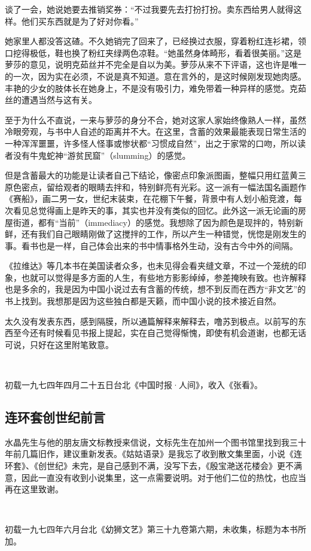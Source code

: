 \par 谈了一会，她说她要去推销奖券：“不过我要先去打扮打扮。卖东西给男人就得这样。他们买东西就是为了好对你看。”
\par 她家里人都没答这碴。不久她销完了回来了，已经换过衣服，穿着粉红连衫裙，领口挖得极低，鞋也换了粉红夹绿两色凉鞋。“她虽然身体畸形，看着很美丽。”这是萝莎的意见，说明克茹丝并不完全是自以为美。萝莎从来不下评语，这也许是唯一的一次，因为实在必须，不说是真不知道。意在言外的，是这时候刚发现她肉感。丰艳的少女的肢体长在她身上，不是没有吸引力，难免带着一种异样的感觉。克茹丝的遭遇当然与这有关。
\par 至于为什么不直说，一来与萝莎的身分不合，她对这家人家始终像熟人一样，虽然冷眼旁观，与书中人自述的距离并不大。在这里，含蓄的效果最能表现日常生活的一种浑浑噩噩，许多怪人怪事或惨状都“习惯成自然”，出之于家常的口吻，所以读者没有牛鬼蛇神“游贫民窟”（slumming）的感觉。
\par 但是含蓄最大的功能是让读者自己下结论，像密点印象派图画，整幅只用红蓝黄三原色密点，留给观者的眼睛去拌和，特别鲜亮有光彩。这一派有一幅法国名画题作《赛船》，画二男一女，世纪末装束，在花棚下午餐，背景中有人划小船竞渡，每次看见总觉得画上是昨天的事，其实也并没有类似的回忆。此外这一派无论画的房屋街道，都有“当前”（immediacy）的感觉。我想除了因为颜色是现拌的，特别新鲜，还有我们自己眼睛刚做了这搅拌的工作，所以产生一种错觉，恍惚是刚发生的事。看书也是一样，自己体会出来的书中情事格外生动，没有古今中外的间隔。
\par 《拉维达》等几本书在美国读者众多，也未见得会看夹缝文章，不过一个笼统的印象，也就可以觉得是多方面的人生，有些地方影影绰绰，参差掩映有致。也许解释也是多余的，我是因为中国小说过去有含蓄的传统，想不到反而在西方“非文艺”的书上找到。我想那是因为这些独白都是天籁，而中国小说的技术接近自然。
\par 太久没有发表东西，感到隔膜，所以通篇解释来解释去，噜苏到极点。以前写的东西至今还有时候看见书报上提起，实在自己觉得惭愧，即使有机会道谢，也都无话可说，只好在这里附笔致意。
\par  
\par *初载一九七四年四月二十五日台北《中国时报·人间》，收入《张看》。


\subsection{连环套创世纪前言}

\par 水晶先生与他的朋友唐文标教授来信说，文标先生在加州一个图书馆里找到我三十年前几篇旧作，建议重新发表。《姑姑语录》是我忘了收到散文集里面，小说《连环套》、《创世纪》未完，是自己感到不满，没写下去，《殷宝滟送花楼会》更不满意，因此一直没有收到小说集里，这一点需要说明。对于他们二位的热忱，也应当再在这里致谢。
\par {}
\par  
\par *初载一九七四年六月台北《幼狮文艺》第三十九卷第六期，未收集，标题为本书所加。




